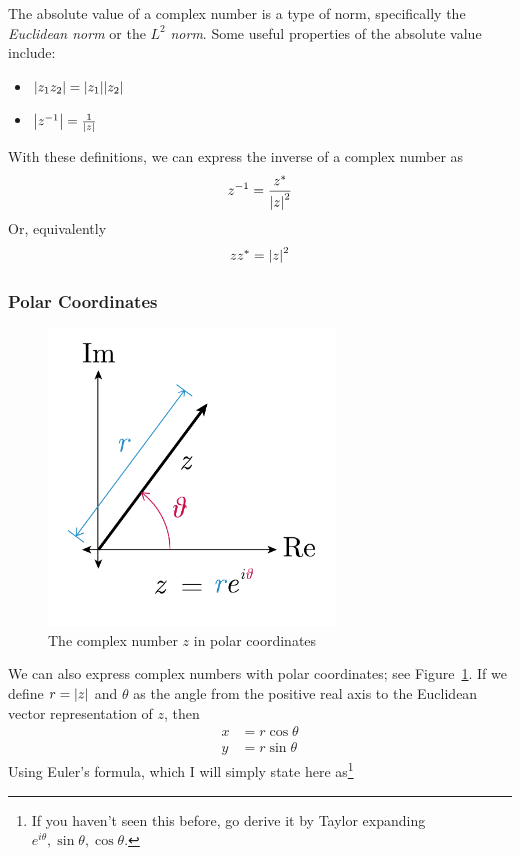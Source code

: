 \documentclass[10pt]{scrartcl}
\numberwithin{equation}{subsection}
\theoremstyle{definition}
\theoremstyle{remark}
\newcommand{\inv}[1]{
		{#1}^{-1}
	}
\newcommand*{\conj}[1]{{#1}^*}
\begin{document}
The absolute value of a complex number is a type of norm, specifically the
\textit{Euclidean norm} or the $L^2$ \textit{norm}. 
Some useful properties of the absolute value include:
\begin{itemize}
	\item $\abs{z_1 z_2} = \abs{z_1} \abs{z_2}$
	\item $\abs{\inv{z}} = \frac{1}{\abs{z}}$
\end{itemize}
With these definitions, we can express the inverse of a complex number as
\begin{equation}
	\inv{z} = \frac{\conj{z}}{\abs{z}^2}
\end{equation}
Or, equivalently
\begin{equation}
	z \conj{z} = \abs{z}^2
\end{equation}
\subsubsection{Polar Coordinates}
\begin{figure}[h!]
	\centering
	\caption{The complex number $z$ in polar coordinates}
	\label{fig:polar}
	\includegraphics[width=3in]{complex_number_diagram-02}
\end{figure}
We can also express complex numbers with polar coordinates;
see Figure~\ref{fig:polar}.  If we define $r=\abs{z}$
and $\theta$ as the angle from the positive real axis to the Euclidean vector
representation of $z$, then 
\begin{align}
	x &= r \cos{\theta} \\
	y &= r \sin{\theta}
\end{align}
Using Euler's formula, which I will simply state here as\footnote{If you
haven't seen this before, go derive it by Taylor expanding $e^{i\theta}, \sin
\theta, \cos \theta$.} 
\end{document}
